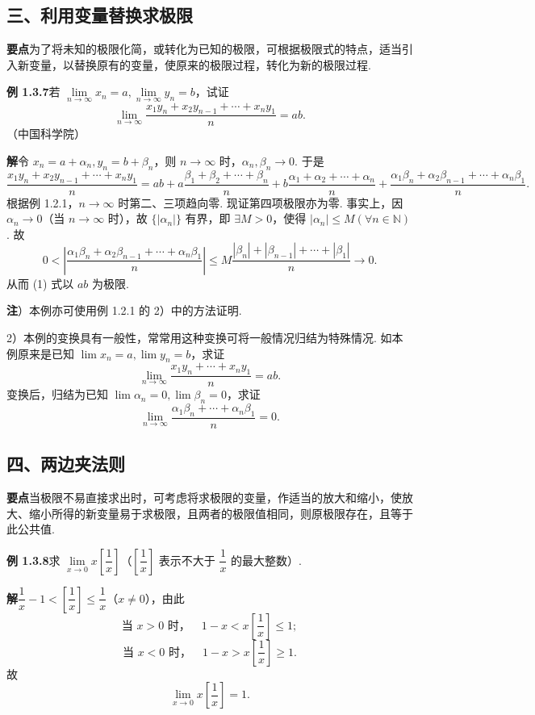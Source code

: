 \documentclass[UTF8, 12pt, fontset=fandol, oneside]{ctexart}
\begin{document}
\subsection*{三、利用变量替换求极限}

\noindent\textbf{要点}\quad 为了将未知的极限化简，或转化为已知的极限，可根据极限式的特点，适当引入新变量，以替换原有的变量，使原来的极限过程，转化为新的极限过程.

\noindent\textbf{例 1.3.7}\quad 若 $\lim\limits_{n\to\infty}x_n=a,\lim\limits_{n\to\infty}y_n=b$，试证
\[
  \lim_{n\to\infty}\frac{x_1y_n+x_2y_{n-1}+\cdots+x_ny_1}{n}=ab.
\]
（中国科学院）

\noindent\textbf{解}\quad 令 $x_n=a+\alpha_n,y_n=b+\beta_n$，则 $n\to\infty$ 时，$\alpha_n,\beta_n\to0$. 于是
\[
\frac{x_1y_n+x_2y_{n-1}+\cdots+x_ny_1}{n}
=ab+a\frac{\beta_1+\beta_2+\cdots+\beta_n}{n}
+b\frac{\alpha_1+\alpha_2+\cdots+\alpha_n}{n}
+\frac{\alpha_1\beta_n+\alpha_2\beta_{n-1}+\cdots+\alpha_n\beta_1}{n}.
\tag{1}
\]
根据例 1.2.1，$n\to\infty$ 时第二、三项趋向零. 现证第四项极限亦为零. 事实上，因 $\alpha_n\to0$（当 $n\to\infty$ 时），故 $\{|\alpha_n|\}$ 有界，即 $\exists M>0$，使得 $|\alpha_n|\le M(\forall n\in\mathbb{N})$. 故
\[
0<\left|\frac{\alpha_1\beta_n+\alpha_2\beta_{n-1}+\cdots+\alpha_n\beta_1}{n}\right|
\le M\frac{|\beta_n|+|\beta_{n-1}|+\cdots+|\beta_1|}{n}\to0.
\]
从而 (1) 式以 $ab$ 为极限.

\noindent\textbf{注}）本例亦可使用例 1.2.1 的 2）中的方法证明.

2）本例的变换具有一般性，常常用这种变换可将一般情况归结为特殊情况. 如本例原来是已知 $\lim x_n=a,\lim y_n=b$，求证
\[
  \lim_{n\to\infty}\frac{x_1y_n+\cdots+x_ny_1}{n}=ab.
\]
变换后，归结为已知 $\lim\alpha_n=0,\lim\beta_n=0$，求证
\[
  \lim_{n\to\infty}\frac{\alpha_1\beta_n+\cdots+\alpha_n\beta_1}{n}=0.
\]

\subsection*{四、两边夹法则}

\noindent\textbf{要点}\quad 当极限不易直接求出时，可考虑将求极限的变量，作适当的放大和缩小，使放大、缩小所得的新变量易于求极限，且两者的极限值相同，则原极限存在，且等于此公共值.

\noindent\textbf{例 1.3.8}\quad 求 $\lim\limits_{x\to0}x\left[\dfrac1x\right]$（$\left[\dfrac1x\right]$ 表示不大于 $\dfrac1x$ 的最大整数）.

\noindent\textbf{解}\quad $\dfrac1x-1<\left[\dfrac1x\right]\le\dfrac1x$（$x\ne0$），由此
\[
\text{当 }x>0\text{ 时，}\quad 1-x<x\left[\frac1x\right]\le1;
\]
\[
\text{当 }x<0\text{ 时，}\quad 1-x>x\left[\frac1x\right]\ge1.
\]
故
\[
  \lim_{x\to0}x\left[\frac1x\right]=1.
\]
\end{document}
